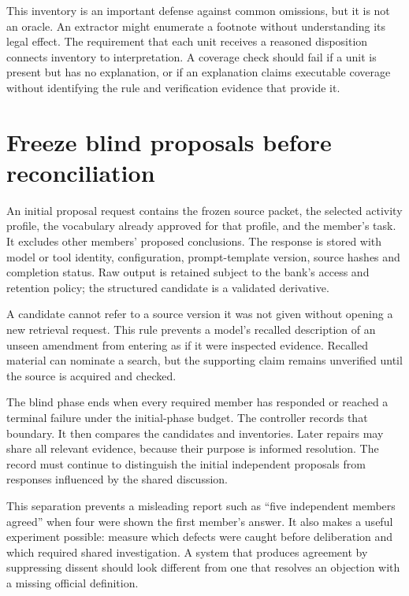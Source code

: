 \documentclass[12pt,a4paper,oneside,openany]{book}
\begin{document}
This inventory is an important defense against common omissions, but it is not
an oracle. An extractor might enumerate a footnote without understanding its
legal effect. The requirement that each unit receives a reasoned disposition
connects inventory to interpretation. A coverage check should fail if a unit is
present but has no explanation, or if an explanation claims executable coverage
without identifying the rule and verification evidence that provide it.

\section{Freeze blind proposals before reconciliation}
\label{merge:M06:04}


An initial proposal request contains the frozen source packet, the selected
activity profile, the vocabulary already approved for that profile, and the
member's task. It excludes other members' proposed conclusions. The response is
stored with model or tool identity, configuration, prompt-template version, source
hashes and completion status. Raw output is retained subject to the bank's access
and retention policy; the structured candidate is a validated derivative.

A candidate cannot refer to a source version it was not given without opening a
new retrieval request. This rule prevents a model's recalled description of an
unseen amendment from entering as if it were inspected evidence. Recalled
material can nominate a search, but the supporting claim remains unverified
until the source is acquired and checked.

The blind phase ends when every required member has responded or reached a
terminal failure under the initial-phase budget. The controller records that
boundary. It then compares the candidates and inventories. Later repairs may
share all relevant evidence, because their purpose is informed resolution. The
record must continue to distinguish the initial independent proposals from
responses influenced by the shared discussion.

This separation prevents a misleading report such as ``five independent members
agreed'' when four were shown the first member's answer. It also makes a useful
experiment possible: measure which defects were caught before deliberation and
which required shared investigation. A system that produces agreement by
suppressing dissent should look different from one that resolves an objection
with a missing official definition.
\end{document}
